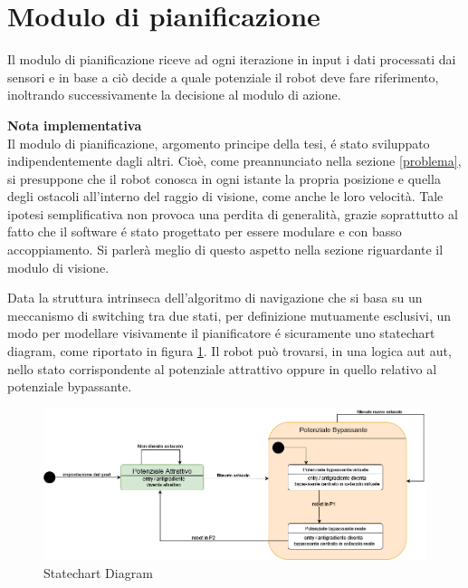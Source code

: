 \documentclass[14pt,a4paper]{extarticle}
\begin{document}
\section{Modulo di pianificazione}
Il modulo di pianificazione riceve ad ogni iterazione in input i dati processati dai sensori e in base a ciò decide a quale potenziale il robot deve fare riferimento, inoltrando successivamente la decisione al modulo di azione. 
\begin{nota}
\textbf{Nota implementativa} \\ Il modulo di pianificazione, argomento principe della tesi, é stato sviluppato indipendentemente dagli altri. Cioè, come preannunciato nella sezione \ref{problema}, si presuppone che il robot conosca in ogni istante la propria posizione e quella degli ostacoli all'interno del raggio di visione, come anche le loro velocità. Tale ipotesi semplificativa non provoca una perdita di generalità, grazie soprattutto al fatto che il software é stato progettato per essere modulare e con basso accoppiamento. Si parlerà meglio di questo aspetto nella sezione riguardante il modulo di visione.
\end{nota}
Data la struttura intrinseca dell'algoritmo di navigazione che si basa su un meccanismo di switching tra due stati, per definizione mutuamente esclusivi, un modo per modellare visivamente il pianificatore é sicuramente uno statechart diagram, come riportato in figura \ref{state}. Il robot può trovarsi, in una logica aut aut, nello stato corrispondente al potenziale attrattivo oppure in quello relativo al potenziale bypassante.

\begin{figure}[H]
\caption{Statechart Diagram} \label{state}
\includegraphics[width=\textwidth]{statechart.png}
\end{figure}
\end{document}
